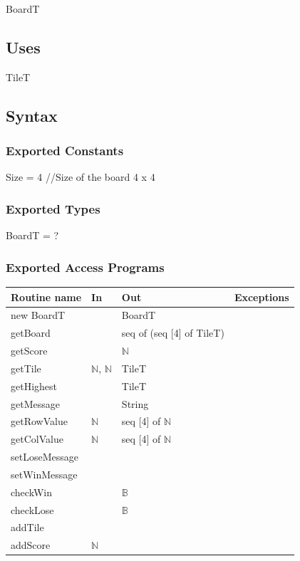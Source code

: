 \documentclass[12pt]{article}
\begin{document}
BoardT

\subsection* {Uses}

TileT

\subsection* {Syntax}

\subsubsection* {Exported Constants}

Size = 4 //Size of the board 4 x 4

\subsubsection* {Exported Types}

BoardT = ?

\subsubsection* {Exported Access Programs}

\begin{tabular}{| l | l | l | p{5cm} |}
  \hline
  \textbf{Routine name} & \textbf{In} & \textbf{Out} & \textbf{Exceptions}\\
  \hline
  new BoardT & & BoardT & \\
  \hline
  getBoard & & seq of (seq [4] of TileT) & ~\\
  \hline
  getScore & & $\mathbb{N}$ & ~\\
  \hline
  getTile & $\mathbb{N}$, $\mathbb{N}$ & TileT & ~\\
  \hline
  getHighest & & TileT & ~\\
  \hline
  getMessage & & String & ~\\
  \hline
  getRowValue & $\mathbb{N}$ & seq [4] of $\mathbb{N}$ & ~\\
  \hline
  getColValue & $\mathbb{N}$ & seq [4] of $\mathbb{N}$ & ~\\
  \hline
  setLoseMessage & & & ~\\
  \hline
  setWinMessage & & & ~\\
  \hline
  checkWin & & $\mathbb{B}$ & ~\\
  \hline
  checkLose & & $\mathbb{B}$ & ~\\
  \hline
  addTile & & & ~\\
  \hline
  addScore & $\mathbb{N}$ & & ~\\
  \hline
  
\end{tabular}
\end{document}
